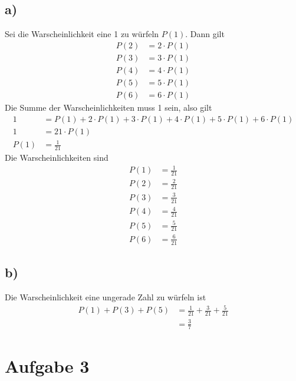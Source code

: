 \documentclass[a4paper]{scrartcl}
\begin{document}
\subsection*{a)}
Sei die Warscheinlichkeit eine 1 zu würfeln $ P(1)$. Dann gilt 
\begin{align*}
	P(2) &= 2 \cdot P(1) \\
	P(3) &= 3 \cdot P(1) \\
	P(4) &= 4 \cdot P(1) \\
	P(5) &= 5 \cdot P(1) \\
	P(6) &= 6 \cdot P(1) 
\end{align*}
Die Summe der Warscheinlichkeiten muss 1 sein, also gilt
\begin{align*}
	1 &= P(1) + 2 \cdot P(1) + 3 \cdot P(1) + 4 \cdot P(1) + 5 \cdot P(1) + 6 \cdot P(1) \\
	1 &= 21 \cdot P(1) \\
	P(1) &= \frac{1}{21}
\end{align*}
Die Warscheinlichkeiten sind
\begin{align*}
	P(1) &= \frac{1}{21} \\
	P(2) &= \frac{2}{21} \\
	P(3) &= \frac{3}{21} \\
	P(4) &= \frac{4}{21} \\
	P(5) &= \frac{5}{21} \\
	P(6) &= \frac{6}{21}
\end{align*}

\subsection*{b)}
Die Warscheinlichkeit eine ungerade Zahl zu würfeln ist 
\begin{align*}
	P(1) + P(3) + P(5) &= \frac{1}{21} + \frac{3}{21} + \frac{5}{21} \\
	&= \frac{3}{7}
\end{align*}

\section*{Aufgabe 3}
\end{document}
